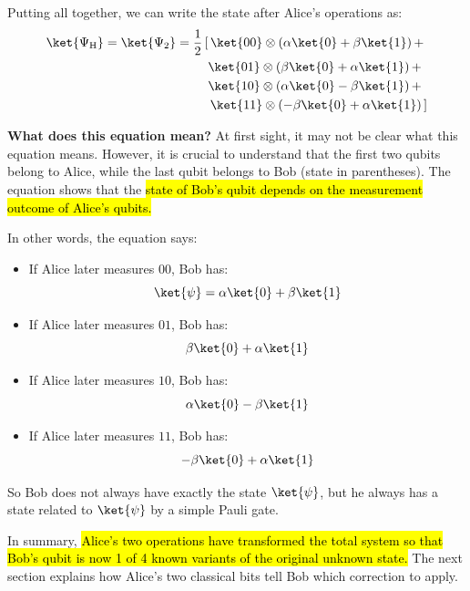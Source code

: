 Putting all together, we can write the state after Alice's operations as:
\begin{equation}
    \begin{aligned}
        \ket{\Psi_{\text{H}}} = \ket{\Psi_{2}} &= \frac{1}{2} \left[ \,
            \ket{00} \otimes \left(\alpha\ket{0} + \beta\ket{1}\right) + \right. \\
            & \hspace{0.88cm} \ket{01} \otimes \left(\beta\ket{0} + \alpha\ket{1}\right) + \\
            & \hspace{0.88cm} \ket{10} \otimes \left(\alpha\ket{0} - \beta\ket{1}\right) + \\
            & \hspace{0.84cm} \left. \ket{11} \otimes \left(-\beta\ket{0} + \alpha\ket{1}\right)
        \, \right]
    \end{aligned}
\end{equation}

\newpage

\noindent
\textcolor{Green3}{ \textbf{What does this equation mean?}} At first sight, it may not be clear what this equation means. However, it is crucial to understand that the first two qubits belong to Alice, while the last qubit belongs to Bob (state in parentheses). The equation shows that the \hl{state of Bob's qubit depends on the measurement outcome of Alice's qubits.}

\highspace
In other words, the equation says:
\begin{itemize}
    \item If Alice later measures $00$, Bob has:
    \begin{equation*}
        \ket{\psi} = \alpha\ket{0} + \beta\ket{1}
    \end{equation*}

    \item If Alice later measures $01$, Bob has:
    \begin{equation*}
        \beta\ket{0} + \alpha\ket{1}
    \end{equation*}

    \item If Alice later measures $10$, Bob has:
    \begin{equation*}
        \alpha\ket{0} - \beta\ket{1}
    \end{equation*}

    \item If Alice later measures $11$, Bob has:
    \begin{equation*}
        -\beta\ket{0} + \alpha\ket{1}
    \end{equation*}
\end{itemize}
So Bob does not always have exactly the state $\ket{\psi}$, but he always has a state related to $\ket{\psi}$ by a simple Pauli gate.

\highspace
In summary, \hl{Alice's two operations have transformed the total system so that Bob's qubit is now 1 of 4 known variants of the original unknown state.} The next section explains how Alice's two classical bits tell Bob which correction to apply.
